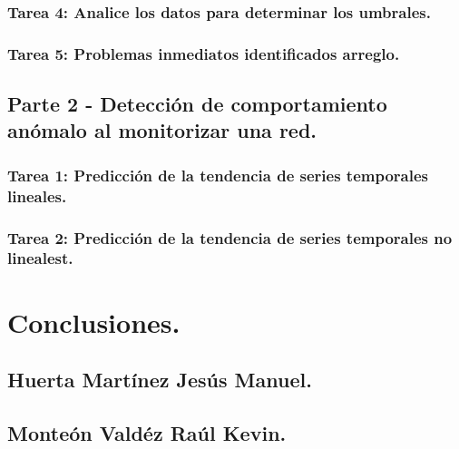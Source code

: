 \documentclass[oneside,10pt]{book}
\begin{document}
\subsection{Tarea 4: Analice los datos para determinar los umbrales.}

\subsection{Tarea 5: Problemas inmediatos identificados arreglo.}


\section{Parte 2 - Detección de comportamiento anómalo al monitorizar una red.}

\subsection{Tarea 1: Predicción de la tendencia de series temporales lineales.}

\subsection{Tarea 2: Predicción de la tendencia de series temporales no linealest.}


\chapter{Conclusiones.}

\section{Huerta Martínez Jesús Manuel.}

\section{Monteón Valdéz Raúl Kevin.}
\end{document}
